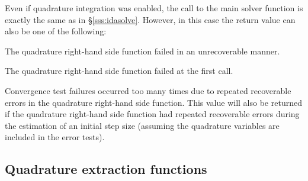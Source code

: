 {Even if quadrature integration was enabled, the call to the main solver 
function  is exactly the same as in \S\ref{sss:idasolve}. However, in
this case the return value  can also be one of the following:
\begin{args}
\item[\Id{IDA\_QRHS\_FAIL}]
  The quadrature right-hand side function failed in an unrecoverable manner.
\item[\Id{IDA\_FIRST\_QRHS\_ERR}]
  The quadrature right-hand side function failed at the first call.
\item[\Id{IDA\_REP\_QRHS\_ERR}]
  Convergence test failures occurred too many times due to repeated
  recoverable errors in the quadrature right-hand side function. This
  value will also be returned if the quadrature right-hand side function
  had repeated recoverable errors during the estimation of an initial step
  size (assuming the quadrature variables are included in the error tests).
  \end{args}


\subsection{Quadrature extraction functions}\label{ss:quad_get}

}
